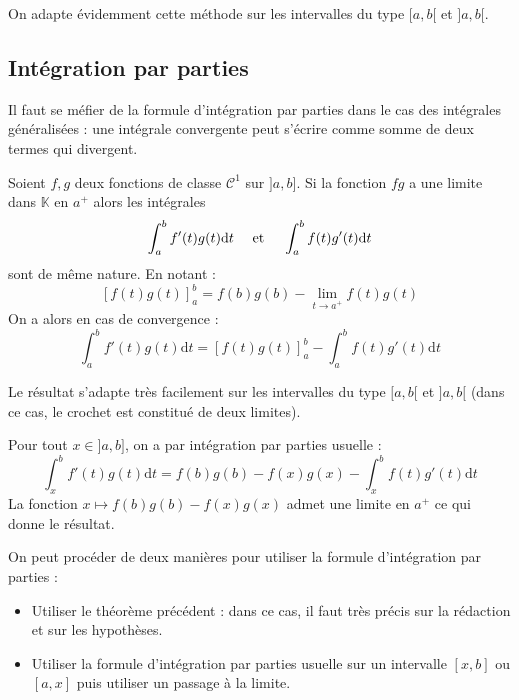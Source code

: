 \documentclass[french,11pt,twoside]{VcCours}
\newcommand{\dt}{\text{d}t}
\begin{document}
On adapte évidemment cette méthode sur les intervalles du type $[a,b[$ et $]a,b[$.
\subsection{Intégration par parties}

Il faut se méfier de la formule d'intégration par parties dans le cas des intégrales généralisées : une intégrale convergente peut s'écrire comme somme de deux termes qui divergent.

\begin{Theoreme}{} Soient $f,g$ deux fonctions de classe $\mathcal{C}^1$ sur $]a,b]$. Si la fonction $fg$ a une limite dans $\mathbb{K}$ en $a^+$ alors les intégrales 
$$ \int_{a}^{b} f'(t) g(t) \dt \quad \hbox{ et } \quad \int_{a}^{b} f(t) g'(t) \dt $$
sont de même nature. En notant :
$$ [f(t) g(t)]_{a}^{b} = f(b)g(b) - \lim_{t \rightarrow a^+} f(t)g(t)$$
On a alors en cas de convergence :
$$  \int_{a}^{b} f'(t) g(t) \dt = [f(t) g(t)]_{a}^{b} - \int_{a}^b f(t) g'(t) \dt$$
\end{Theoreme}

\begin{Remarque}{} Le résultat s'adapte très facilement sur les intervalles du type $[a,b[$ et $]a,b[$ (dans ce cas, le crochet est constitué de deux limites).
\end{Remarque}

\begin{Demonstration}{} Pour tout $x \in ]a,b]$, on a par intégration par parties \og usuelle \fg :
$$ \int_{x}^{b} f'(t) g(t) \dt = f(b)g(b)-f(x)g(x) - \int_{x}^b f(t) g'(t) \dt$$
La fonction $x \mapsto f(b)g(b)-f(x)g(x)$ admet une limite en $a^+$ ce qui donne le résultat.
\end{Demonstration}

\begin{Remarque}{} On peut procéder de deux manières pour utiliser la formule d'intégration par parties :

\begin{itemize}
\item Utiliser le théorème précédent : dans ce cas, il faut très précis sur la rédaction et sur les hypothèses.
\item Utiliser la formule d'intégration par parties usuelle sur un intervalle $[x,b]$ ou $[a,x]$ puis utiliser un passage à la limite.
\end{itemize}
\end{Remarque}
\end{document}
